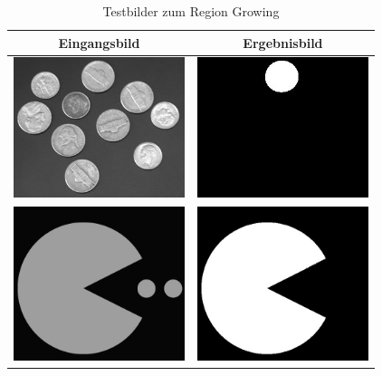 \documentclass[12pt,german]{article}
\begin{document}
\begin{table}[H]
  \centering
  \begin{tabular}{| c | c | }
    \hline
    Eingangsbild & Ergebnisbild \\
    \hline
    \includegraphics[width=5cm]{../TestData/coins.jpg}  & \includegraphics[width=5cm]{../TestData/coins_result1.jpg}\\
	\hline
	\includegraphics[width=5cm]{../TestData/packman.jpg}  & \includegraphics[width=5cm]{../TestData/packman_result1.jpg}\\
	\hline
     
  \end{tabular}
  \caption{Testbilder zum Region Growing}
\end{table}


\begin{landscape}

\end{landscape}
\end{document}

